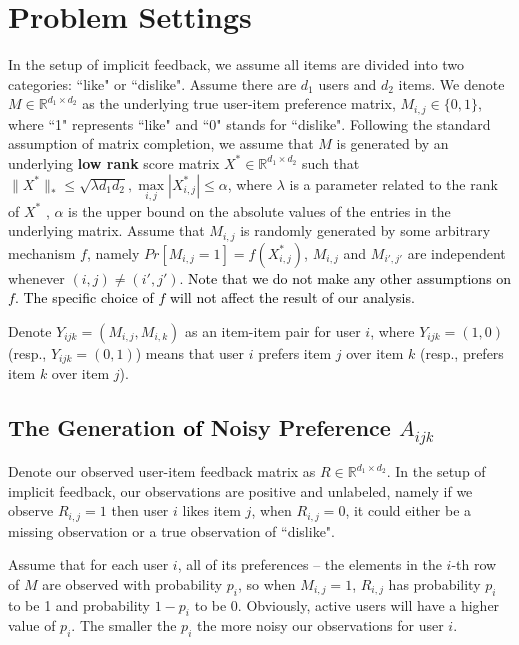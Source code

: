 \documentclass[conference]{IEEEtran}
\numberwithin{equation}{section}
\newcommand{\laks}[1]{\textcolor{black}{#1}}
\newcommand{\R}{\mathbb{R}}
\newtheorem{sampling strategy}{Sampling Strategy}
\begin{document}
\section{Problem Settings}
\label{sec:prob}

In the setup of implicit feedback, we assume all items are divided into two categories:  ``like" or ``dislike". Assume there are $d_1$ users and $d_2$ items. We denote $M \in \R^{d_1 \times d_2}$ as the underlying true user-item preference matrix, $M_{i,j} \in \{0,1\}$, where ``1" represents ``like" and ``0" stands for ``dislike". Following the standard assumption of matrix completion, we assume that $M$ is generated by an underlying \textbf{low rank} score matrix $X^* \in \R^{d_1 \times d_2}$ such that $ \|X^*\|_* \leq \sqrt{\lambda d_1 d_2}, \underset{i,j}{\max} |X_{i,j}^*| \leq \alpha$, where $\lambda$ is a parameter related to the rank of $X^*$ \cite{cr}, $\alpha$ is the upper bound on the absolute values of the entries in the underlying matrix. 
Assume that $M_{i,j}$ is randomly generated by some arbitrary mechanism $f$, namely $Pr[M_{i,j} = 1] = f(X^*_{i,j})$, $M_{i,j}$ and $M_{i',j'}$ are independent whenever $(i,j) \neq (i',j')$. \laks{Note that we do not make any other assumptions on $f$. The specific choice of $f$ will not affect the result of our analysis.} 

Denote $Y_{ijk} = (M_{i,j}, M_{i,k})$ as an item-item pair for user $i$, where $Y_{ijk} = (1,0)$  (resp.,   $Y_{ijk} = (0,1)$) means that user $i$ prefers item $j$ over item $k$ (resp., prefers item $k$ over item $j$).  

\subsection{The Generation \laks{of} Noisy Preference $A_{ijk}$}

Denote our observed user-item feedback matrix as $R \in \R^{d_1 \times d_2}$. In the setup of implicit feedback, our observations are positive and unlabeled, namely if we observe $R_{i,j} = 1$ then user $i$ likes item $j$, when $R_{i,j} = 0$, it could either be a missing observation or a true observation of ``dislike". 

Assume that for each user $i$, all of its preferences -- the elements in the $i$-th row of $M$ are observed with probability $p_i$, so when $M_{i,j} = 1$, $R_{i,j}$ has probability $p_i$ to be 1 and probability $1-p_i$ to be 0. Obviously, active users  will have a higher value of $p_i$. The smaller the $p_i$ the more noisy  our observations for user $i$.
\end{document}
